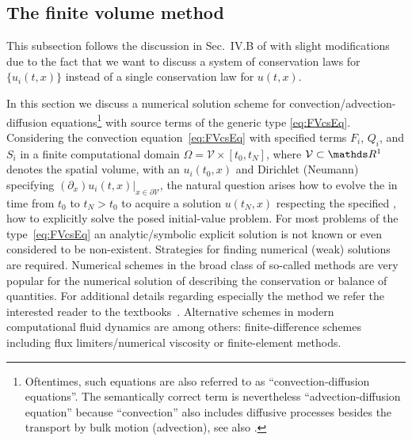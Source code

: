 \clearpage
\subsection{The finite volume method}\label{subsec:hydroFV}
\begin{disclaimer}
	This subsection follows the discussion in Sec.~IV.B of  with slight modifications due to the fact that we want to discuss a system of conservation laws for $\{u_i ( t, x )\}$ instead of a single conservation law for $u ( t, x )$. 
\end{disclaimer}
In this section we discuss a numerical solution scheme for convection/advection-diffusion equations\footnote{%
	Oftentimes, such equations are also referred to as ``convection-diffusion equations''.
	The semantically correct term is nevertheless ``advection-diffusion equation'' because ``convection'' also includes diffusive processes besides the transport by bulk motion (advection), see also .%
} 
with source terms of the generic type \eqref{eq:FVcsEq}. 
Considering the convection equation~\eqref{eq:FVcsEq} with specified terms $F_i$, $Q_i$, and $S_i$ in a finite computational domain $\Omega = \mathcal{V} \times [ t_0, t_N ]$, where $\mathcal{V} \subset \Reals{}^1$ denotes the spatial volume, with an \ic{} $u_i( t_0, x )$ and Dirichlet (Neumann) \bcs{} specifying $( \partial_x ) u_i ( t, x ) |_{x \in \partial \mathcal{V}}$, the natural question arises how to evolve the \ic{} in time from $t_0$ to $t_N>t_0$ to acquire a solution $u ( t_N, x )$ respecting the specified \bcs{} \dash{} \ie{}, how to explicitly solve the posed initial-value problem.
For most problems of the type~\eqref{eq:FVcsEq} an analytic/symbolic explicit solution is not known or even considered to be non-existent.
Strategies for finding numerical (weak) solutions are required.
Numerical schemes in the broad class of so-called  methods are very popular for the numerical solution of \pdes{} describing the conservation or balance of quantities.
For additional details regarding especially the \fv{} method we refer the interested reader to the textbooks~\cite{LeVeque:2002,Vazquez-Cendon2015}.
Alternative \hrsc{} schemes in modern computational fluid dynamics are among others: finite-difference schemes including flux limiters/numerical viscosity or finite-element methods.

